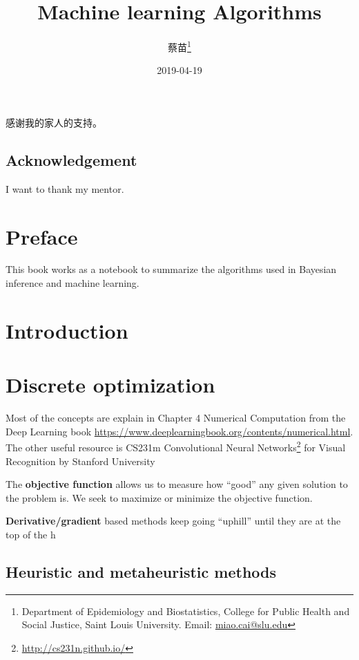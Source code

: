 \documentclass[fontset=fandol,zihao=false,scheme=chinese,heading=true,UTF8]{ctexbook}
\title{{\fontsize{26}{30}\selectfont \textbf{Machine learning Algorithms}}}
\author{蔡苗\footnote{Department of Epidemiology and Biostatistics, College for Public Health and Social Justice, Saint Louis University. Email: \url{miao.cai@slu.edu}}}
\date{2019-04-19}
\newenvironment{dedication}
{
   \cleardoublepage
   \thispagestyle{empty}
   \vspace*{\stretch{1}}
   \hfill\begin{minipage}[t]{0.66\textwidth}
   \raggedright
}
{
   \end{minipage}
   \vspace*{\stretch{3}}
   \clearpage
}
\renewcommand{\href}[2]{#2\footnote{\url{#1}}}
\begin{document}
\maketitle

\begin{dedication}
感谢我的家人的支持。
\end{dedication}

\section*{Acknowledgement}

I want to thank my mentor.

{
\setcounter{tocdepth}{2}
\tableofcontents
}
\listoftables
\listoffigures



\hypertarget{preface}{%
\chapter{Preface}\label{preface}}

This book works as a notebook to summarize the algorithms used in Bayesian inference and machine learning.

\mainmatter

\hypertarget{introduction}{%
\chapter{Introduction}\label{introduction}}

\hypertarget{discrete-optimization}{%
\chapter{Discrete optimization}\label{discrete-optimization}}

Most of the concepts are explain in Chapter 4 Numerical Computation from the Deep Learning book \url{https://www.deeplearningbook.org/contents/numerical.html}.
The other useful resource is \href{http://cs231n.github.io/}{CS231m Convolutional Neural Networks} for Visual Recognition by Stanford University

The \textbf{objective function} allows us to measure how ``good'' any given solution to the problem is.
We seek to maximize or minimize the objective function.

\textbf{Derivative/gradient} based methods keep going ``uphill'' until they are at the top of the h

\hypertarget{heuristic-and-metaheuristic-methods}{%
\section{Heuristic and metaheuristic methods}\label{heuristic-and-metaheuristic-methods}}
\end{document}
